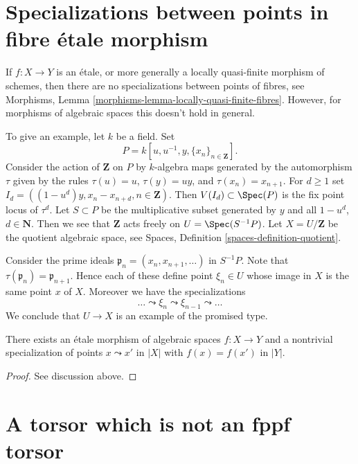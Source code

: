\section{Specializations between points in fibre \'etale morphism}
\label{section-specializations-fibre-etale}

\noindent
If $f : X \to Y$ is an \'etale, or more generally a locally quasi-finite
morphism of schemes, then there are no specializations between points of
fibres, see
Morphisms, Lemma \ref{morphisms-lemma-locally-quasi-finite-fibres}.
However, for morphisms of algebraic spaces this doesn't hold in general.

\medskip\noindent
To give an example, let $k$ be a field.
Set
$$
P = k[u, u^{-1}, y, \{x_n\}_{n \in \mathbf{Z}}].
$$
Consider the action
of $\mathbf{Z}$ on $P$ by $k$-algebra maps generated by the automorphism
$\tau$ given by the rules $\tau(u) = u$, $\tau(y) = uy$, and
$\tau(x_n) = x_{n + 1}$. For $d \geq 1$ set
$I_d = ((1 - u^d)y, x_n - x_{n + d}, n \in \mathbf{Z})$.
Then $V(I_d) \subset \Spec(P)$ is the fix point locus of $\tau^d$.
Let $S \subset P$ be the multiplicative subset generated by $y$ and
all $1 - u^d$, $d \in \mathbf{N}$. Then we
see that $\mathbf{Z}$ acts freely on $U = \Spec(S^{-1}P)$.
Let $X = U/\mathbf{Z}$ be the quotient algebraic space, see
Spaces, Definition \ref{spaces-definition-quotient}.

\medskip\noindent
Consider the prime ideals $\mathfrak p_n = (x_n, x_{n + 1}, \ldots)$ in
$S^{-1}P$. Note that $\tau(\mathfrak p_n) = \mathfrak p_{n + 1}$.
Hence each of these define point $\xi_n \in U$ whose image in $X$ is
the same point $x$ of $X$. Moreover we have the specializations
$$
\ldots \leadsto \xi_n \leadsto \xi_{n - 1} \leadsto \ldots
$$
We conclude that $U \to X$ is an example of the promised type.

\begin{lemma}
\label{lemma-specializations-fibre-etale}
There exists an \'etale morphism of algebraic spaces $f : X \to Y$
and a nontrivial specialization of points $x \leadsto x'$ in $|X|$ with
$f(x) = f(x')$ in $|Y|$.
\end{lemma}

\begin{proof}
See discussion above.
\end{proof}







\section{A torsor which is not an fppf torsor}
\label{section-torsor-not-fppf}

